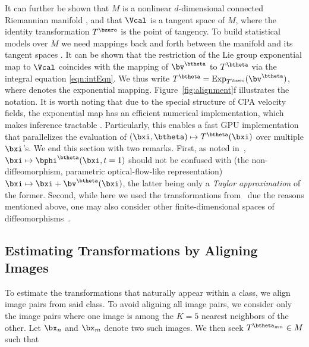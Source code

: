 \documentclass[twoside]{article}
\DeclareMathOperator{\Exp}{Exp}
\newcommand{\OREN}[1]{\textbf{[Freifeld says: #1]}}
\begin{document}
    It can further be shown that $M$ is a nonlinear
    $d$-dimensional connected Riemannian manifold \cite{freifeld2015transform},
    and that $\Vcal$ is a tangent space
    of $M$, where the identity transformation $T^{\bzero}$ is the point of
    tangency.    
    To build statistical models over $M$ we need mappings back and forth
    between the manifold and its tangent spaces \cite{pennec:jmiv:2006}.
    It can be shown that the restriction of the Lie group exponential map 
    to $\Vcal$ coincides with the mapping of $\bv^\btheta$ to $T^\btheta$ via
    the integral equation \eqref{eqn:intEqn}. 
    We 
    thus
    write $T^\btheta = \Exp_{T^{\bzero}} (\bv^\btheta)$,
    where 
    denotes the exponential mapping.
    Figure~\ref{fig:alignment}f illustrates the notation.
    It is worth noting that due to the special structure of CPA velocity fields, the exponential map has an efficient numerical
    implementation, which makes inference tractable \cite{freifeld2015transform}.
    Particularly, this enables a fast GPU implementation 
    that parallelizes the evaluation of $(\bxi,\btheta)\mapsto T^\btheta(\bxi)$  over multiple $\bxi$'s.
    We end this section with two remarks.
    First, as noted in~\cite{freifeld2015transform}, $\bxi\mapsto \phiThetaAt{\bxi}{t=1}$ should
    not be confused with (the non-diffeomorphism, parametric optical-flow-like representation) $\bxi\mapsto\bxi +\bv^\btheta(\bxi)$,
    the latter being only a \emph{Taylor approximation} of the former.
    Second, while here we used the transformations from~\cite{freifeld2015transform} due the reasons mentioned above,
    one may also consider other finite-dimensional spaces of diffeomorphisms~\cite{zhang:ipmi:2015,Arsigny:BIR:2006}. 
    
  \subsection{Estimating Transformations by Aligning Images}
    To estimate the transformations that naturally appear within a class, we
    align image pairs from said class. To avoid aligning all image pairs, we consider only the image pairs 
    where one image is among the $K=5$ nearest neighbors of the other.    
    Let $\bx_n$ and $\bx_m$ denote two such images. We then seek
    $T^{\btheta_{mn}} \in M$ such that  
    
\end{document}
